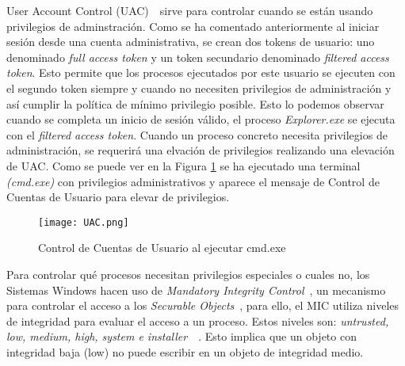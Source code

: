 User Account Control (UAC)~\cite{Capitulo2:UAC}~\cite{Capitulo2:UAC2}sirve para controlar cuando se están usando privilegios de adminstración. Como se ha comentado anteriormente al iniciar sesión desde una cuenta administrativa, se crean dos tokens de usuario: uno denominado {\it full access token} y un token secundario denominado {\it filtered access token}. Esto permite que los procesos ejecutados por este usuario se ejecuten con el segundo token siempre y cuando no necesiten privilegios de administración y así cumplir la política de mínimo privilegio posible. Esto lo podemos observar cuando se completa un inicio de sesión válido, el proceso {\it Explorer.exe} se ejecuta con el {\it filtered access token}. Cuando un proceso concreto necesita privilegios de administración, se requerirá una elvación de privilegios realizando una elevación de UAC. Como se puede ver en la Figura \ref{UAC} se ha ejecutado una terminal {\it (cmd.exe)} con privilegios administrativos y aparece el mensaje de Control de Cuentas de Usuario para elevar de privilegios. \\

\begin{figure}[t!] %
\begin{center}
\texttt{[image: UAC.png]}
\end{center}
\caption{Control de Cuentas de Usuario al ejecutar cmd.exe}
\label{UAC}
\end{figure}

Para controlar qué procesos necesitan privilegios especiales o cuales no, los Sistemas Windows hacen uso de {\it Mandatory Integrity Control}~\cite{Capitulo2:MIC}, un mecanismo para controlar el acceso a los {\it Securable Objects}~\cite{Capitulo2:Securable-Objects}, para ello, el MIC utiliza niveles de integridad para evaluar el acceso a un proceso. Estos niveles son: {\it untrusted, low, medium, high, system e installer}~\cite{Capitulo2:IntegrityLabels}~\cite{Capitulo2:IntegrityLabels2}. Esto implica que un objeto con integridad baja (low) no puede escribir en un objeto de integridad medio. \\

